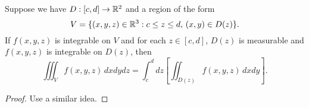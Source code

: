 \begin{theorem}
  Suppose we have $D : [c, d] \to \mathbb{R}^2$ and a region of
  the form
  \[
    V = \{(x, y, z) \in \mathbb{R}^3 : c \le z \le d,\, (x, y) \in D(z)\}.
  \]
  If $f(x, y, z)$ is integrable on $V$ and for each
  $z \in [c, d]$, $D(z)$ is measurable and
  $f(x, y, z)$ is integrable on $D(z)$, then
  \[
    \iiint_V f(x, y, z)\, dx dy dz
    = \int_c^d dz \left[\iint_{D(z)} f(x, y, z)\, dx dy\right].
  \]
\end{theorem}

\begin{proof}
  Use a similar idea.
\end{proof}
